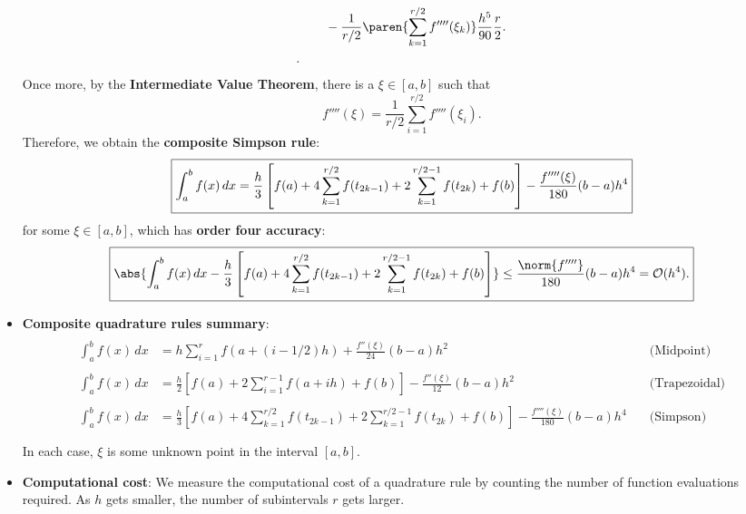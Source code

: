 \documentclass{report}
\begin{document}
\begin{itemize}
\begin{align*}
                & \qquad -\frac{1}{r/2}\paren{\sum_{k=1}^{r/2} f''''(\xi_k)} \frac{h^5}{90}\frac{r}{2}. \\
            .\end{align*}
            Once more, by the \textbf{Intermediate Value Theorem}, there is a $\xi \in [a,b]$ such that
            $$f''''(\xi) = \frac{1}{r/2} \sum_{i=1}^{r/2} f''''(\xi_i).$$
            Therefore, we obtain the \textbf{composite Simpson rule}:
            $$
            \fbox{${\displaystyle
                    \int_a^b f(x)\,dx = \frac{h}{3}\left[f(a) + 4 \sum_{k=1}^{r/2} f(t_{2k-1}) + 2 \sum_{k=1}^{r/2-1} f(t_{2k}) + f(b)\right]
                    - \frac{f''''(\xi)}{180} (b - a) h^4
            }$}
            $$
            for some $\xi \in [a,b]$, which has \textbf{order four accuracy}:
            $$
            \fbox{${\displaystyle
                    \abs{\int_a^b f(x)\,dx - \frac{h}{3}\left[f(a) + 4 \sum_{k=1}^{r/2} f(t_{2k-1}) + 2 \sum_{k=1}^{r/2-1} f(t_{2k}) + f(b)\right]} \leq
                    \frac{\norm{f''''}}{180} (b - a) h^4 = \mathcal{O}(h^4).
            }$}
            $$
        \item \textbf{Composite quadrature rules summary}:
            \begin{align*}
                \\
                \int_a^b f(x)\,dx &= h \sum_{i=1}^r f(a + (i - 1/2)h) + \frac{f''(\xi)}{24} (b - a) h^2 
                \quad &\text{(Midpoint)} \\\\
                \int_a^b f(x)\,dx &= \frac{h}{2}\left[f(a) + 2 \sum_{i=1}^{r-1} f(a + ih) + f(b)\right] - \frac{f''(\xi)}{12} (b - a) h^2  
                \quad &\text{(Trapezoidal)} \\\\
                \int_a^b f(x)\,dx &= \frac{h}{3}\left[f(a) + 4 \sum_{k=1}^{r/2} f(t_{2k-1}) + 2 \sum_{k=1}^{r/2-1} f(t_{2k}) + f(b)\right] - \frac{f''''(\xi)}{180} (b - a) h^4
                \quad &\text{(Simpson)} \\\\
            \end{align*}
            In each case, $\xi$ is some unknown point in the interval $[a,b]$.
        \item \textbf{Computational cost}:
            We measure the computational cost of a quadrature rule by counting the number of function evaluations required.
            \bigbreak \noindent 
            As $h$ gets smaller, the number of subintervals $r$ gets larger.

\end{itemize}
\end{document}
